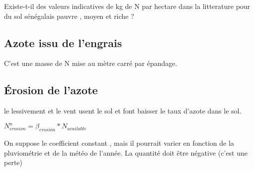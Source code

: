 \documentclass[10pt,a4paper,french]{article} %
\begin{document}
\begin{tcolorbox}[noparskip,
    colback=LimeGreen,colframe=Green,%
    colbacklower=LimeGreen!75!LightGreen,%
    title=Changement]
Existe-t-il des valeurs indicatives de kg de N par hectare dans la litterature pour du sol sénégalais pauvre , moyen  et  riche  ? 
\end{tcolorbox}









\subsection{Azote issu de l'engrais}


C'est une masse de N mise au mètre carré par épandage.


\subsection{Érosion de l'azote}

le lessivement et  le vent usent le sol et font baisser le taux d'azote dans le sol. 

$N_{erosion}^n = \beta_{erosion}* N_{available}$


On suppose le coefficient constant , mais il pourrait varier en fonction de la pluviométrie et de la météo de l'année.
La quantité doit être négative (c'est une perte) 
\end{document}
